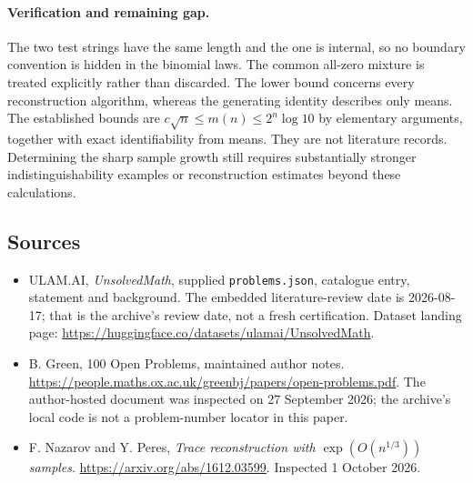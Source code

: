 \documentclass[11pt,a4paper]{article}
\begin{document}
\paragraph{Verification and remaining gap.}
The two test strings have the same length and the one is internal, so no boundary convention is hidden in the binomial laws. The common all-zero mixture is treated explicitly rather than discarded. The lower bound concerns every reconstruction algorithm, whereas the generating identity describes only means. The established bounds are $c\sqrt n\leq m(n)\leq2^n\log10$ by elementary arguments, together with exact identifiability from means. They are not literature records. Determining the sharp sample growth still requires substantially stronger indistinguishability examples or reconstruction estimates beyond these calculations.

\subsection{Sources}

{\small

\begin{itemize}

\item[\hypertarget{source:statement:1}{S1}] ULAM.AI, \emph{UnsolvedMath}, supplied \texttt{problems.json}, catalogue entry, statement and background. The embedded literature-review date is 2026-08-17; that is the archive’s review date, not a fresh certification. Dataset landing page: \url{https://huggingface.co/datasets/ulamai/UnsolvedMath}.

\item[\hypertarget{source:statement:2}{S2}] B. Green, 100 Open Problems, maintained author notes. \url{https://people.maths.ox.ac.uk/greenbj/papers/open-problems.pdf}. The author-hosted document was inspected on 27 September 2026; the archive’s local code is not a problem-number locator in this paper.

\item[E1] F. Nazarov and Y. Peres, \emph{Trace reconstruction with $\exp(O(n^{1/3}))$ samples}. \url{https://arxiv.org/abs/1612.03599}. Inspected 1 October 2026.

\end{itemize}

}

\label{end:statement}
\end{document}
